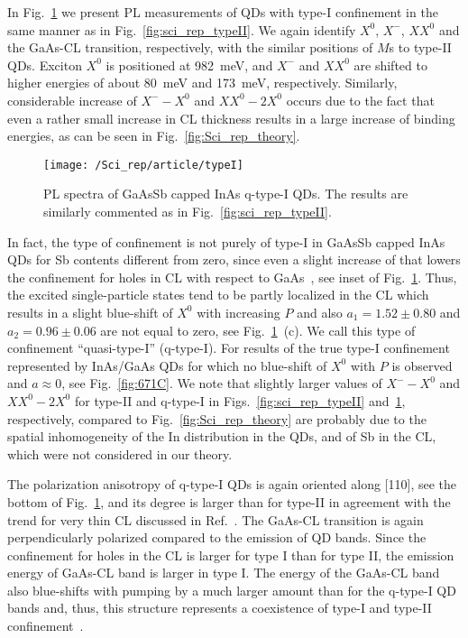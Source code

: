 In Fig.~\ref{fig:scirep_typeIq} we present PL measurements of QDs with type-I confinement in the same manner as in Fig.~\ref{fig:sci_rep_typeII}. We again identify $X^0$, $X^-$, $XX^0$ and the GaAs-CL transition, respectively, with the similar positions of $M$s to type-II QDs. Exciton $X^0$ is positioned at 982~meV, and $X^-$ and $XX^0$ are shifted to higher energies of about 80~meV and 173~meV, respectively. Similarly, considerable increase of $X^--X^0$ and $XX^0-2X^0$ occurs due to the fact that even a rather small increase in CL thickness results in a large increase of binding energies, as can be seen in Fig.~\ref{fig:Sci_rep_theory}. 
%
\begin{figure}
	\centering
	\texttt{[image: /Sci\_rep/article/typeI]}
	\caption{PL spectra of GaAsSb capped InAs q-type-I QDs. The results are similarly commented as in Fig.~\ref{fig:sci_rep_typeII}.}
	\label{fig:scirep_typeIq}
\end{figure}
%
In fact, the type of confinement is not purely of type-I in GaAsSb capped InAs QDs for Sb contents different from zero, since even a slight increase of that lowers the confinement for holes in CL with respect to GaAs~\cite{Klenovsky10}, see inset of Fig.~\ref{fig:scirep_typeIq}. Thus, the excited single-particle states tend to be partly localized in the CL which results in a slight blue-shift of $X^0$ with increasing $P$ and also $a_1=1.52\pm0.80$ and $a_2=0.96\pm0.06$ are not equal to zero, see Fig.~\ref{fig:scirep_typeIq}~(c). We call this type of confinement \enquote{quasi-type-I} (q-type-I). For results of the true type-I confinement represented by InAs/GaAs QDs for which no blue-shift of $X^0$ with $P$ is observed and $a\approx0$, see Fig.~\ref{fig:671C}. We note that slightly larger values of $X^--X^0$ and $XX^0-2X^0$ for type-II and q-type-I in Figs.~\ref{fig:sci_rep_typeII} and~\ref{fig:scirep_typeIq}, respectively, compared to Fig.~\ref{fig:Sci_rep_theory} are probably due to the spatial inhomogeneity of the In distribution in the QDs, and of Sb in the CL, which were not considered in our theory. 

The polarization anisotropy of q-type-I QDs is again oriented along [110], see the bottom of Fig.~\ref{fig:scirep_typeIq}, and its degree is larger than for type-II in agreement with the trend for very thin CL discussed in Ref.~\citep{Klenovsky2017}. The GaAs-CL transition is again perpendicularly polarized compared to the emission of QD bands. Since the confinement for holes in the CL is larger for type I than for type II, the emission energy of GaAs-CL band is larger in type I. The energy of the GaAs-CL band also blue-shifts with pumping by a much larger amount than for the q-type-I QD bands and, thus, this structure represents a coexistence of type-I and type-II confinement~\cite{Ji2015}.


